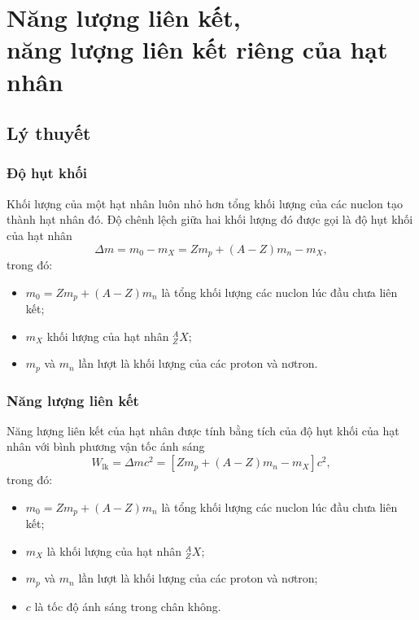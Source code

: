 
\chapter[Năng lượng liên kết, \\năng lượng liên kết riêng của hạt nhân]{Năng lượng liên kết,\\ năng lượng liên kết riêng của hạt nhân}
\section{Lý thuyết}

\subsection{Độ hụt khối}
Khối lượng của một hạt nhân luôn nhỏ hơn tổng khối lượng của các nuclon tạo thành hạt nhân đó. Độ chênh lệch giữa hai khối lượng đó được gọi là độ hụt khối của hạt nhân
\begin{equation}
	\Delta m = m_0 - m_X = Z m_p+ (A-Z) m_n - m_X,
\end{equation}
trong đó:
\begin{itemize}
	\item $m_0=Z m_p+ (A-Z) m_n$ là tổng khối lượng các nuclon lúc đầu chưa liên kết;
	\item $m_X$ khối lượng của hạt nhân $^A_Z X$;
	\item $m_p$ và $m_n$ lần lượt là khối lượng của các proton và nơtron.
\end{itemize}
\subsection{Năng lượng liên kết}
Năng lượng liên kết của hạt nhân được tính bằng tích của độ hụt khối của hạt nhân với bình phương vận tốc ánh sáng
\begin{equation}
	W_\text{lk}=\Delta m c^2 = \left[ Z m_p+ (A-Z) m_n - m_X \right] c^2,
\end{equation}
trong đó:
\begin{itemize}
	\item $m_0=Z m_p+ (A-Z) m_n$ là tổng khối lượng các nuclon lúc đầu chưa liên kết;
	\item $m_X$ là khối lượng của hạt nhân $^A_Z X$;
	\item $m_p$ và $m_n$ lần lượt là khối lượng của các proton và nơtron;
	\item $c$ là tốc độ ánh sáng trong chân không.
\end{itemize}
